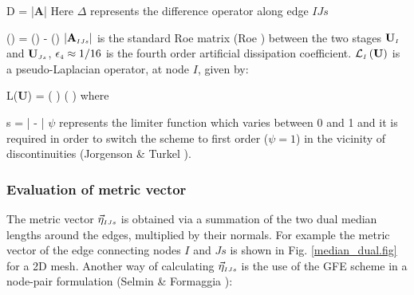 %
\beq
  {\cal D} = 
  \left|{\bf A}\right|
  \label{artifical_diffusion_nl.eq}
\eeq
%
 Here $\Delta$ represents the difference operator along edge $IJs$

%
\beq
  \Delta\left(\cdot\right) = \left(\cdot\right) -
\left(\cdot\right)
\label{difference_operator.eq}
\eeq
%
 $\left|{\bf A}_{\mbox{\tiny $IJs$}}\right|$ is the standard Roe matrix
 (Roe )
 between the two stages ${\bf U}_{\mbox{\tiny $I$}}$ and ${\bf U}_{\mbox{\tiny $Js$}}$,
 $\epsilon_{\mbox{\tiny $4$}}\approx 1/16$ is the fourth order artificial dissipation
 coefficient. $\cal L_{\mbox{\tiny $I$}}\left({\bf U}\right)$ is a pseudo-Laplacian
 operator, at node $I$, given by:

%
\beq
  {\cal L}\left({\bf U}\right) =
  \left(\sum{}
  \right)
  \left(\sum{}
  \right)
  \label{pseudo_lapl_nl.eq}
\eeq
%
 where

%
\beq
  s = \left| - \right|
  \label{svalll.eq}
\eeq
%
 $\psi$ represents the limiter function which varies between
 0 and 1 and it is required in order to switch the scheme to first order
 ($\psi = 1$) in the vicinity of discontinuities (Jorgenson \&
 Turkel ).
%
%
\subsubsection{Evaluation of metric vector}
%
 The metric vector $\vec{\eta}_{\mbox{\tiny $IJs$}}$ is obtained
 via a summation of the two dual median lengths around the edges,
 multiplied by their normals. For example the metric vector of the edge
 connecting nodes $I$ and $Js$ is shown in Fig. \ref{median_dual.fig} for a
 2D mesh.
 Another way of calculating $\vec{\eta}_{\mbox{\tiny $IJs$}}$ is the use of the
 GFE scheme in a node-pair formulation
 (Selmin \& Formaggia ):

